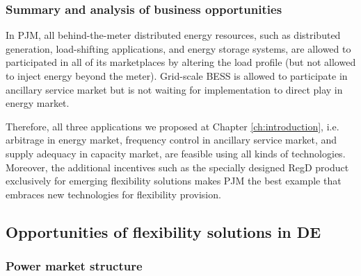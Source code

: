 

\subsubsection{Summary and analysis of business opportunities}
In PJM, all behind-the-meter distributed energy resources, such as distributed generation, load-shifting applications, and energy storage systems, are allowed to participated in all of its marketplaces by altering the load profile (but not allowed to inject energy beyond the meter). Grid-scale BESS is allowed to participate in ancillary service market but is not waiting for implementation to direct play in energy market. 

Therefore, all three applications we proposed at Chapter \ref{ch:introduction}, i.e. arbitrage in energy market, frequency control in ancillary service market, and supply adequacy in capacity market,  are feasible using all kinds of technologies. Moreover, the additional incentives such as the specially designed RegD product exclusively for emerging flexibility solutions makes PJM the best example that embraces new technologies for flexibility provision.

\subsection{Opportunities of flexibility solutions in DE}
\label{sec:quali-de}
\subsubsection{Power market structure}

